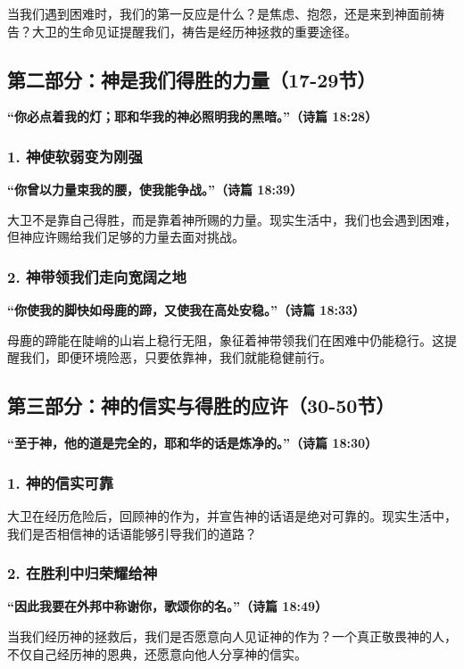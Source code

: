 \documentclass[a4paper, 12pt]{article}
\begin{document}
当我们遇到困难时，我们的第一反应是什么？是焦虑、抱怨，还是来到神面前祷告？大卫的生命见证提醒我们，祷告是经历神拯救的重要途径。

\subsection*{第二部分：神是我们得胜的力量（17-29节）}

\textbf{“你必点着我的灯；耶和华我的神必照明我的黑暗。”（诗篇 18:28）}

\subsubsection*{1. 神使软弱变为刚强}
\textbf{“你曾以力量束我的腰，使我能争战。”（诗篇 18:39）}

大卫不是靠自己得胜，而是靠着神所赐的力量。现实生活中，我们也会遇到困难，但神应许赐给我们足够的力量去面对挑战。

\subsubsection*{2. 神带领我们走向宽阔之地}
\textbf{“你使我的脚快如母鹿的蹄，又使我在高处安稳。”（诗篇 18:33）}

母鹿的蹄能在陡峭的山岩上稳行无阻，象征着神带领我们在困难中仍能稳行。这提醒我们，即便环境险恶，只要依靠神，我们就能稳健前行。

\subsection*{第三部分：神的信实与得胜的应许（30-50节）}

\textbf{“至于神，他的道是完全的，耶和华的话是炼净的。”（诗篇 18:30）}

\subsubsection*{1. 神的信实可靠}
大卫在经历危险后，回顾神的作为，并宣告神的话语是绝对可靠的。现实生活中，我们是否相信神的话语能够引导我们的道路？

\subsubsection*{2. 在胜利中归荣耀给神}
\textbf{“因此我要在外邦中称谢你，歌颂你的名。”（诗篇 18:49）}

当我们经历神的拯救后，我们是否愿意向人见证神的作为？一个真正敬畏神的人，不仅自己经历神的恩典，还愿意向他人分享神的信实。
\end{document}
